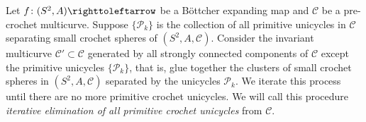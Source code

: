 \documentclass{amsart}
\theoremstyle{plain}
\newtheorem{lemma}[theorem]{Lemma}
\theoremstyle{definition}
\theoremstyle{remark}
\newcommand{\hide}[1]{}
\newcommand{\CC}{{\mathcal C}}
\newcommand{\PC}{{\mathcal P}}
\newcommand\selfmap{\righttoleftarrow}
\begin{document}
\hide{\begin{lemma}\label{lem: gluing crochet}
Let $f\colon (S^2,A,\CC)\selfmap$ be a B\"ottcher expanding map and $\PC$ be a primitive unicycle of $\CC$.  Also, let $\CC'\subset \CC$ be the invariant multicurve\footnote{ Note that $\CC'$ is empty, if $\CC$ has only one strongly connected component. }  generated by all the strongly connected components of $\CC$ except $\PC$. Suppose $\widehat S_1$ and $\widehat S_2$ are the two small spheres (in the decomposition wrt.\ $\CC$) with $\gamma\in \PC$ on the boundary.  Denote by $\widehat S$ the unique small sphere wrt.\ $\CC'$ that contains both $\widehat S_1$ and $\widehat S_2$. 
\begin{enumerate}[label=\text{(\roman*)},font=\normalfont,leftmargin=*]
\item If both spheres $\widehat S_1$ and $\widehat S_2$ are Sierpi\'{n}ski, then $\widehat S$ is Sierpi\'{n}ski sphere. 
\item Suppose both spheres $\widehat S_1$ and $\widehat S_2$ are crochet. If one of them is $\CC[\gamma]$-vacant, where $\CC[\gamma]$ is the invariant multicurve induced by $\{\gamma\}$, then $\widehat S$ is a crochet sphere.

\end{enumerate}
\end{lemma}}


Let $f\colon (S^2, A)\selfmap$ be a B\"{o}ttcher expanding map and $\CC$ be a pre-crochet multicurve. Suppose $\{\PC_k\}$ is the collection of all primitive unicycles in $\CC$ separating small crochet spheres of $(S^2, A, \CC)$. Consider the invariant multicurve $\CC'\subset \CC$ generated by all strongly connected components of $\CC$ except the primitive unicycles $\{\PC_k\}$, that is, glue together the clusters of small crochet spheres in $(S^2, A,\CC)$ separated by the unicycles $\PC_k$. We iterate this process until there are no more primitive crochet unicycles. We will call this procedure \emph{iterative elimination of all primitive crochet unicycles} from $\CC$.
\end{document}
